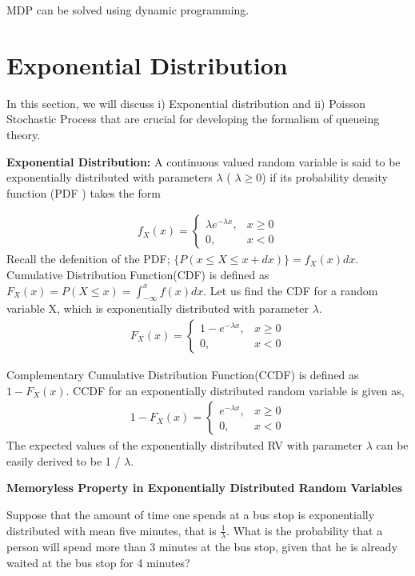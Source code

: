 MDP can be solved using dynamic programming.

\section{Exponential Distribution}
In this section, we will discuss   i) Exponential distribution and ii) Poisson Stochastic Process that are crucial for developing the formalism of queueing theory.

\textbf{Exponential Distribution:} A continuous valued random variable is said to be exponentially distributed with parameters $\lambda$ ( $\lambda \geq 0$) if its probability density function (PDF ) takes the form 

\begin{align*}
    f_X(x)=\begin{cases} 
    \lambda e^{-\lambda x}, & x \geq 0\\
0, & x < 0
\end{cases}
\end{align*}
Recall the defenition of the PDF;  $\{P(x \leq X \leq x+dx)\}=f_X(x)dx$.
Cumulative Distribution Function(CDF) is defined as $F_X(x)=P(X \leq x)=\int_{-\infty}^x f(x)dx$.
Let us find the CDF for a random variable X, which is exponentially distributed with parameter $\lambda$.
\begin{align*}
    F_X(x)=\begin{cases} 
    1- e^{-\lambda x}, & x \geq 0\\
0, & x < 0
\end{cases}
\end{align*}

Complementary Cumulative Distribution Function(CCDF) is defined as  $1-F_X(x)$. CCDF for an exponentially distributed random variable is given as,
\begin{align*}
    1-F_X(x)=\begin{cases} 
    e^{-\lambda x}, & x \geq 0\\
0, & x < 0
\end{cases}
\end{align*}
The expected values of the exponentially distributed RV with parameter $\lambda$ can be easily derived to be 1 / $\lambda$.

\textbf{Memoryless Property in Exponentially Distributed Random Variables}

Suppose that the amount of time one spends at a bus stop is exponentially distributed with mean five minutes, that is $\frac{1}{\lambda}$. What is the probability that a person will spend more than 3 minutes at the bus stop, given that he is already waited at the bus stop for 4 minutes? 

